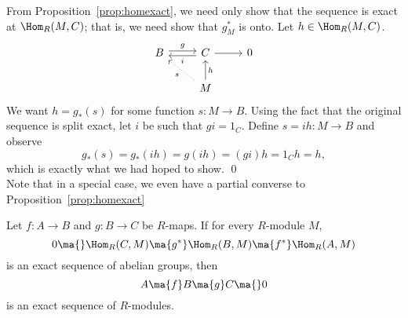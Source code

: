 \pf From Proposition~\ref{prop:homexact}, we need only show that the sequence is exact at $\Hom_R(M,C)$; that is, we need show that $g^*_M$ is onto. Let $h \in \Hom_R(M,C)$.
	\[
	\begin{tikzcd}
	B \arrow[yshift=0.5ex]{r}{g} & C \arrow[yshift=-0.5ex]{l}{i} \arrow{r} & 0 \\
	& M \arrow[swap]{u}{h} \arrow[dotted]{ul}{s}
	\end{tikzcd}
	\]
We want $h=g_*(s)$ for some function $s: M \to B$. Using the fact that the original sequence is split exact, let $i$ be such that $gi=1_C$. Define $s=ih: M \to B$ and observe
	\[
	g_*(s)=g_*(ih)=g(ih)=(gi)h=1_Ch=h,
	\]
which is exactly what we had hoped to show. \qed \\


Note that in a special case, we even have a partial converse to Proposition~\ref{prop:homexact}


\begin{prop}
Let $f: A \to B$ and $g: B \to C$ be $R$-maps. If for every $R$-module $M$,
	\[
	0 \ma{} \Hom_R(C,M) \ma{g^*} \Hom_R(B,M) \ma{f^*} \Hom_R(A,M)
	\]
is an exact sequence of abelian groups, then
	\[
	A \ma{f} B \ma{g} C \ma{} 0
	\]
is an exact sequence of $R$-modules. 
\end{prop}
